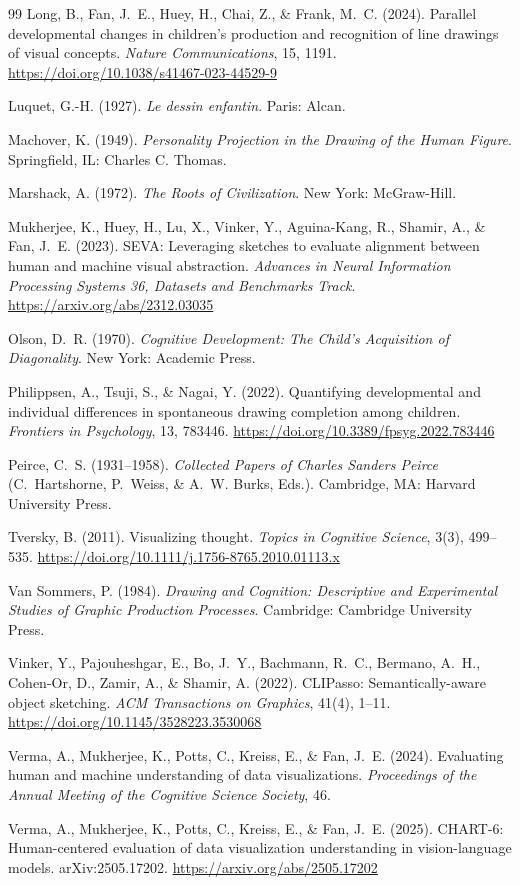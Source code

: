 \documentclass[11pt]{article}
\theoremstyle{remark}
\begin{document}
\begin{thebibliography}{99}
Long, B., Fan, J.~E., Huey, H., Chai, Z., \& Frank, M.~C. (2024).
Parallel developmental changes in children's production and recognition of line drawings of visual concepts.
\emph{Nature Communications}, 15, 1191.
\url{https://doi.org/10.1038/s41467-023-44529-9}

Luquet, G.-H. (1927).
\emph{Le dessin enfantin}.
Paris: Alcan.

Machover, K. (1949).
\emph{Personality Projection in the Drawing of the Human Figure}.
Springfield, IL: Charles C. Thomas.

Marshack, A. (1972).
\emph{The Roots of Civilization}.
New York: McGraw-Hill.

Mukherjee, K., Huey, H., Lu, X., Vinker, Y., Aguina-Kang, R., Shamir, A., \& Fan, J.~E. (2023).
SEVA: Leveraging sketches to evaluate alignment between human and machine visual abstraction.
\emph{Advances in Neural Information Processing Systems 36, Datasets and Benchmarks Track}.
\url{https://arxiv.org/abs/2312.03035}

Olson, D.~R. (1970).
\emph{Cognitive Development: The Child's Acquisition of Diagonality}.
New York: Academic Press.

Philippsen, A., Tsuji, S., \& Nagai, Y. (2022).
Quantifying developmental and individual differences in spontaneous drawing completion among children.
\emph{Frontiers in Psychology}, 13, 783446.
\url{https://doi.org/10.3389/fpsyg.2022.783446}

Peirce, C.~S. (1931--1958).
\emph{Collected Papers of Charles Sanders Peirce} (C.~Hartshorne, P.~Weiss, \& A.~W. Burks, Eds.).
Cambridge, MA: Harvard University Press.

Tversky, B. (2011).
Visualizing thought.
\emph{Topics in Cognitive Science}, 3(3), 499--535.
\url{https://doi.org/10.1111/j.1756-8765.2010.01113.x}

Van Sommers, P. (1984).
\emph{Drawing and Cognition: Descriptive and Experimental Studies of Graphic Production Processes}.
Cambridge: Cambridge University Press.

Vinker, Y., Pajouheshgar, E., Bo, J.~Y., Bachmann, R.~C., Bermano, A.~H., Cohen-Or, D., Zamir, A., \& Shamir, A. (2022).
CLIPasso: Semantically-aware object sketching.
\emph{ACM Transactions on Graphics}, 41(4), 1--11.
\url{https://doi.org/10.1145/3528223.3530068}

Verma, A., Mukherjee, K., Potts, C., Kreiss, E., \& Fan, J.~E. (2024).
Evaluating human and machine understanding of data visualizations.
\emph{Proceedings of the Annual Meeting of the Cognitive Science Society}, 46.

Verma, A., Mukherjee, K., Potts, C., Kreiss, E., \& Fan, J.~E. (2025).
CHART-6: Human-centered evaluation of data visualization understanding in vision-language models.
arXiv:2505.17202.
\url{https://arxiv.org/abs/2505.17202}

\end{thebibliography}
\end{document}
